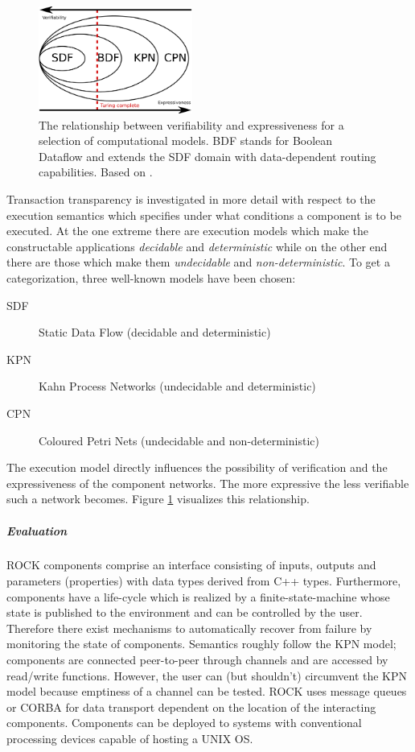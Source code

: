 \documentclass[a4paper,twocolumn]{esapub2005} %
\begin{document}
\begin{figure}
    \centering
    \includegraphics[width=0.45\textwidth]{pics/Verification.png}
    \caption{
        The relationship between verifiability and expressiveness for a selection of computational models.
        BDF stands for Boolean Dataflow and extends the SDF domain with data-dependent routing capabilities.
        Based on \cite{Basten}.
    }
    \label{fig:verifiability}
\end{figure}
Transaction transparency is investigated in more detail with respect to the execution semantics which specifies under what conditions a component is to be executed.
At the one extreme there are execution models which make the constructable applications \emph{decidable} and \emph{deterministic} 
while on the other end there are those which make them \emph{undecidable} and \emph{non-deterministic}.
To get a categorization, three well-known models have been chosen:
\begin{description}
    \item[SDF] Static Data Flow (decidable and deterministic)
    \item[KPN] Kahn Process Networks (undecidable and deterministic)
    \item[CPN] Coloured Petri Nets (undecidable and non-deterministic)
\end{description}
The execution model directly influences the possibility of verification and the expressiveness of the component networks.
The more expressive the less verifiable such a network becomes.
Figure \ref{fig:verifiability} visualizes this relationship.

\subparagraph{Evaluation}
ROCK components comprise an interface consisting of inputs, outputs and parameters (properties) with data types derived from C++ types.
Furthermore, components have a life-cycle which is realized by a finite-state-machine whose state is published to the environment and can be controlled by the user.
Therefore there exist mechanisms to automatically recover from failure by monitoring the state of components. %
Semantics roughly follow the KPN model; components are connected peer-to-peer through channels and are accessed by read/write functions. %
However, the user can (but shouldn't) circumvent the KPN model because emptiness of a channel can be tested.
ROCK uses message queues or CORBA for data transport dependent on the location of the interacting components. %
Components can be deployed to systems with conventional processing devices capable of hosting a UNIX OS. %
\end{document}
